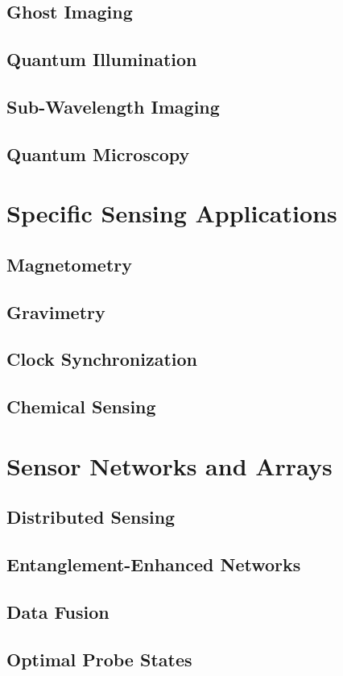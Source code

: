 \documentclass[12pt,a4paper]{book}
\begin{document}
\subsection{Ghost Imaging}
\subsection{Quantum Illumination}
\subsection{Sub-Wavelength Imaging}
\subsection{Quantum Microscopy}

\section{Specific Sensing Applications}
\subsection{Magnetometry}
\subsection{Gravimetry}
\subsection{Clock Synchronization}
\subsection{Chemical Sensing}

\section{Sensor Networks and Arrays}
\subsection{Distributed Sensing}
\subsection{Entanglement-Enhanced Networks}
\subsection{Data Fusion}
\subsection{Optimal Probe States}
\end{document}
